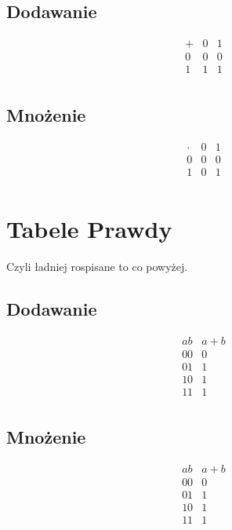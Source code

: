 \documentclass{article}
\begin{document}
\subsection{Dodawanie}
\[
	\begin{array}{c|c|c}
		+ & 0 & 1 \\
		\hline
		0 & 0 & 0 \\
		\hline
		1 & 1 & 1 \\
	\end{array}
\]

\subsection{Mnożenie}
\[
	\begin{array}{c|c|c}
		\cdot & 0 & 1 \\
		\hline
		0     & 0 & 0 \\
		\hline
		1     & 0 & 1 \\
	\end{array}
\]

\section{Tabele Prawdy}
Czyli ładniej rospisane to co powyżej.
\subsection{Dodawanie}
\[\begin{array}{c|c}
		a b & a + b \\
		\hline
		00  & 0     \\
		01  & 1     \\
		10  & 1     \\
		11  & 1     \\
	\end{array}\]
\subsection{Mnożenie}
\[
	\begin{array}{c|c}
		a b & a + b \\
		\hline
		00  & 0     \\
		01  & 1     \\
		10  & 1     \\
		11  & 1     \\
	\end{array}
\]
\end{document}
